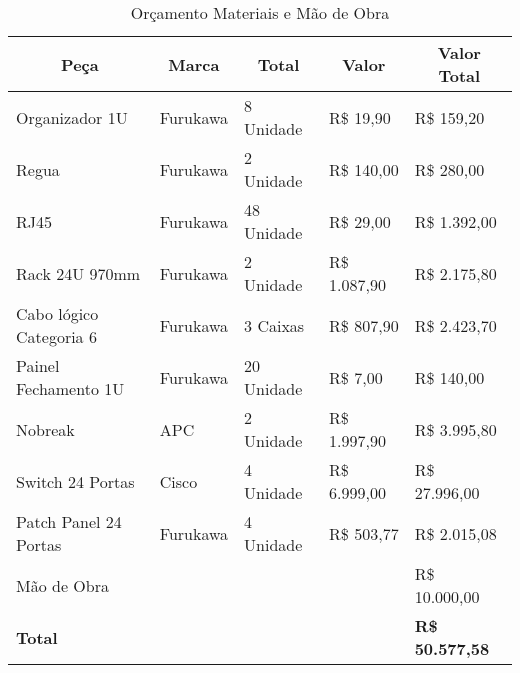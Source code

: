 \begin{table}[h!]
\centering
\caption{Orçamento Materiais e Mão de Obra}
\label{orc}
\begin{tabular}{|l|l|l|l|l|}
\hline
\multicolumn{1}{|c|}{\textbf{Peça}} & \multicolumn{1}{c|}{\textbf{Marca}} & \multicolumn{1}{c|}{\textbf{Total}} & \multicolumn{1}{c|}{\textbf{Valor}} & \multicolumn{1}{c|}{\textbf{Valor Total}} \\ \hline
Organizador 1U                      & Furukawa                            & 8 Unidade                           & R\$      19,90                      & R\$     159,20                            \\ \hline
Regua                               & Furukawa                            & 2 Unidade                           & R\$    140,00                       & R\$     280,00                            \\ \hline
RJ45                                & Furukawa                            & 48 Unidade                          & R\$      29,00                      & R\$  1.392,00                             \\ \hline
Rack 24U 970mm                      & Furukawa                            & 2 Unidade                           & R\$ 1.087,90                        & R\$  2.175,80                             \\ \hline
Cabo lógico Categoria 6             & Furukawa                            & 3 Caixas                            & R\$    807,90                       & R\$  2.423,70                             \\ \hline
Painel Fechamento 1U                & Furukawa                            & 20 Unidade                          & R\$        7,00                     & R\$     140,00                            \\ \hline
Nobreak                             & APC                                 & 2 Unidade                           & R\$ 1.997,90                        & R\$   3.995,80                            \\ \hline
Switch 24 Portas                    & Cisco                               & 4 Unidade                           & R\$ 6.999,00                        & R\$ 27.996,00                             \\ \hline
Patch Panel 24 Portas               & Furukawa                            & 4 Unidade                           & R\$    503,77                       & R\$ 2.015,08                              \\ \hline
Mão de Obra                         &                                     &                                     &                                     & R\$ 10.000,00                             \\ \hline
\textbf{Total}                      &                                     &                                     &                                     & \textbf{R\$ 50.577,58}                    \\ \hline
\end{tabular}
\end{table}